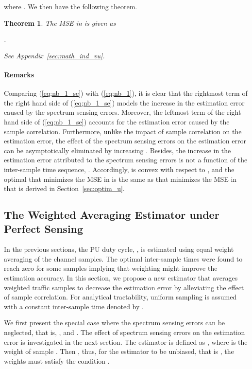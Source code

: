 \documentclass[11pt,draftclsnofoot,journal,onecolumn]{IEEEtran}
\newtheorem{theorem}{Theorem}
\begin{document}
where . We then have the following theorem.
\begin{theorem}
The MSE in  is given as

.
\begin{IEEEproof}
See Appendix~\ref{sec:math_ind_vu}.
\end{IEEEproof} 
\end{theorem}

\paragraph*{Remarks}

Comparing (\ref{eq;nb_1_se}) with (\ref{eq;nb_1}), it is clear that the rightmost term of the right hand side of (\ref{eq;nb_1_se}) models the increase in the estimation error caused by the spectrum sensing errors. Moreover, the leftmost term of the right hand side of (\ref{eq;nb_1_se}) accounts for the estimation error caused by the sample correlation. Furthermore, unlike the impact of sample correlation on the estimation error, the effect of the spectrum sensing errors on the estimation error can be asymptotically eliminated by increasing . Besides, the increase in the estimation error attributed to the spectrum sensing errors is not a function of the inter-sample time sequence, . Accordingly,  is convex with respect to , and the optimal  that minimizes the MSE in  is the same as  that minimizes the MSE in  that is derived in Section~\ref{sec:optim_u}.

\subsection{The Weighted Averaging Estimator under Perfect Sensing}

In the previous sections, the PU duty cycle, , is estimated using equal weight averaging of the channel samples. The optimal inter-sample times were found to reach zero for some samples implying that weighting might improve the estimation accuracy. In this section, we propose a new estimator that averages weighted traffic samples to decrease the estimation error by alleviating the effect of sample correlation. For analytical tractability, uniform sampling is assumed with a constant inter-sample time denoted by .

We first present the special case where the spectrum sensing errors can be neglected, that is, , and . The effect of spectrum sensing errors on the estimation error is investigated in the next section. The estimator is defined as , where  is the weight of sample . Then , thus, for the estimator to be unbiased, that is , the weights must satisfy the condition .
\end{document}
